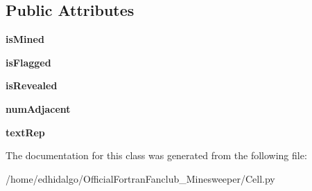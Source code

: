 \subsection*{Public Attributes}
\begin{DoxyCompactItemize}
\item 
\mbox{\label{class_cell_1_1_cell_a2de94d961ce38593b5e2a9ff557d9607}} 
{\bfseries is\+Mined}
\item 
\mbox{\label{class_cell_1_1_cell_a021c79a228f8c3add4e12a2cd71d64d1}} 
{\bfseries is\+Flagged}
\item 
\mbox{\label{class_cell_1_1_cell_af4103c48a2f2bcd2557a6e77b15fda8c}} 
{\bfseries is\+Revealed}
\item 
\mbox{\label{class_cell_1_1_cell_aca8110187e56365b1441bf12f7537da4}} 
{\bfseries num\+Adjacent}
\item 
\mbox{\label{class_cell_1_1_cell_a099cdf84d5d4a0e48d3fc02ceafaee30}} 
{\bfseries text\+Rep}
\end{DoxyCompactItemize}


The documentation for this class was generated from the following file\+:\begin{DoxyCompactItemize}
\item 
/home/edhidalgo/\+Official\+Fortran\+Fanclub\+\_\+\+Minesweeper/Cell.\+py\end{DoxyCompactItemize}
